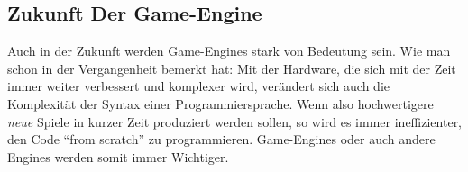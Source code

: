 \subsection{Zukunft Der Game-Engine}
Auch in der Zukunft werden Game-Engines stark von Bedeutung sein. Wie man schon in der Vergangenheit bemerkt hat: Mit der Hardware, die sich mit der Zeit immer weiter verbessert und komplexer wird, verändert sich auch die Komplexität der Syntax einer Programmiersprache.
Wenn also hochwertigere \textit{neue} Spiele in kurzer Zeit produziert werden sollen, so wird es immer ineffizienter, den Code "`from scratch"' zu programmieren. Game-Engines oder auch andere Engines  werden somit immer Wichtiger.
